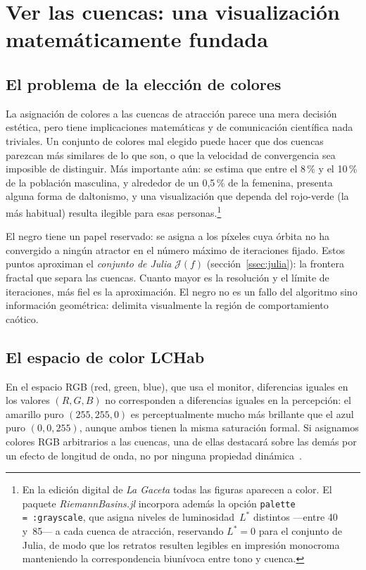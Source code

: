 \documentclass[11pt,a4paper]{article}
\theoremstyle{plain}
\theoremstyle{definition}
\theoremstyle{remark}
\newcommand{\pkg}[1]{\textsl{#1}}
\begin{document}
\section{Ver las cuencas: una visualización matemáticamente fundada}
\label{sec:visualizacion}

\subsection{El problema de la elección de colores}

La asignación de colores a las cuencas de atracción parece una mera decisión
estética, pero tiene implicaciones matemáticas y de comunicación
científica nada triviales.
Un conjunto de colores mal elegido puede hacer que dos cuencas parezcan
más similares de lo que son, o que la velocidad de convergencia sea
imposible de distinguir.
Más importante aún: se estima que entre el 8\,\% y el 10\,\% de la
población masculina, y alrededor de un 0{,}5\,\% de la femenina,
presenta alguna forma de daltonismo, y una visualización que dependa
del rojo-verde (la más habitual) resulta ilegible para esas personas.\footnote{En la edici\'{o}n digital de \emph{La Gaceta} todas las figuras aparecen a color. El paquete \pkg{RiemannBasins.jl} incorpora adem\'{a}s la opci\'{o}n \texttt{palette\,=\,:grayscale}, que asigna niveles de luminosidad~$L^*$ distintos ---entre 40 y~85--- a cada cuenca de atracci\'{o}n, reservando $L^*=0$ para el conjunto de Julia, de modo que los retratos resulten legibles en impresi\'{o}n monocroma manteniendo la correspondencia biunívoca entre tono y cuenca.}

El negro tiene un papel reservado: se asigna a los píxeles cuya órbita
no ha convergido a ningún atractor en el número máximo de iteraciones
fijado.
Estos puntos aproximan el \emph{conjunto de Julia} $\mathcal{J}(f)$
(sección~\ref{ssec:julia}): la frontera fractal que separa las cuencas.
Cuanto mayor es la resolución y el límite de iteraciones, más fiel es la
aproximación.
El negro no es un fallo del algoritmo sino información geométrica:
delimita visualmente la región de comportamiento caótico.

\subsection{El espacio de color LCHab}

En el espacio RGB (red, green, blue), que usa el monitor, diferencias iguales en los
valores $(R,G,B)$ no corresponden a diferencias iguales en la percepción:
el amarillo puro $(255,255,0)$ es perceptualmente mucho más brillante
que el azul puro $(0,0,255)$, aunque ambos tienen la misma saturación
formal.
Si asignamos colores RGB arbitrarios a las cuencas, una de ellas
destacará sobre las demás por un efecto de longitud de onda, no por
ninguna propiedad dinámica~\cite{Zeileis2009}.
\end{document}
